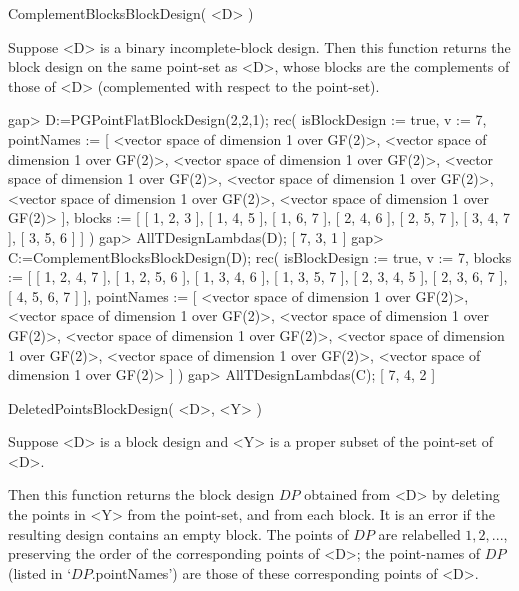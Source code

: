 \>ComplementBlocksBlockDesign( <D> )

Suppose <D> is a binary incomplete-block design.
Then this function returns the block design on the same
point-set as <D>, whose blocks are the complements of
those of <D> (complemented with respect to the point-set).

\beginexample
gap> D:=PGPointFlatBlockDesign(2,2,1);
rec( isBlockDesign := true, v := 7, 
  pointNames := [ <vector space of dimension 1 over GF(2)>, 
      <vector space of dimension 1 over GF(2)>, 
      <vector space of dimension 1 over GF(2)>, 
      <vector space of dimension 1 over GF(2)>, 
      <vector space of dimension 1 over GF(2)>, 
      <vector space of dimension 1 over GF(2)>, 
      <vector space of dimension 1 over GF(2)> ], 
  blocks := [ [ 1, 2, 3 ], [ 1, 4, 5 ], [ 1, 6, 7 ], [ 2, 4, 6 ], 
      [ 2, 5, 7 ], [ 3, 4, 7 ], [ 3, 5, 6 ] ] )
gap> AllTDesignLambdas(D);
[ 7, 3, 1 ]
gap> C:=ComplementBlocksBlockDesign(D);
rec( isBlockDesign := true, v := 7, 
  blocks := [ [ 1, 2, 4, 7 ], [ 1, 2, 5, 6 ], [ 1, 3, 4, 6 ], [ 1, 3, 5, 7 ], 
      [ 2, 3, 4, 5 ], [ 2, 3, 6, 7 ], [ 4, 5, 6, 7 ] ], 
  pointNames := [ <vector space of dimension 1 over GF(2)>, 
      <vector space of dimension 1 over GF(2)>, 
      <vector space of dimension 1 over GF(2)>, 
      <vector space of dimension 1 over GF(2)>, 
      <vector space of dimension 1 over GF(2)>, 
      <vector space of dimension 1 over GF(2)>, 
      <vector space of dimension 1 over GF(2)> ] )
gap> AllTDesignLambdas(C);
[ 7, 4, 2 ]
\endexample



\>DeletedPointsBlockDesign( <D>, <Y> )

Suppose <D> is a block design and <Y> is a proper subset of the point-set
of <D>.

Then this function returns the block design $DP$ obtained from <D> by
deleting the points in <Y> from the point-set, and from each block.
It is an error if the resulting design contains an empty block.
The points of $DP$ are relabelled $1,2,...$, preserving the order of
the corresponding points of <D>; the point-names of $DP$ (listed in
`$DP$.pointNames') are those of these corresponding points of <D>.


